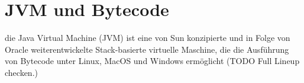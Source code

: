 \chapter{JVM und Bytecode}
\label{cha:jvm}

die Java Virtual Machine (JVM) ist eine von Sun konzipierte und in Folge von Oracle weiterentwickelte Stack-basierte virtuelle Maschine, die die Ausführung von Bytecode unter Linux, MacOS und Windows ermöglicht (TODO Full Lineup checken.)